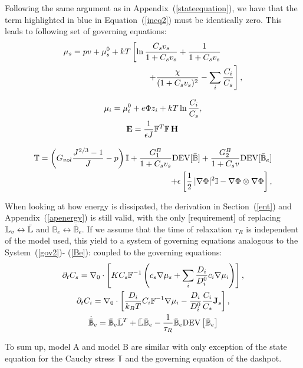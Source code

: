 Following the same argument as in Appendix~(\ref{stateequation}), we have that the term highlighted in blue in Equation~(\ref{ineq2}) must be identically zero. This leads to following set of governing equations:
\begin{gather}
\begin{aligned}
\mu_s = p v + \mu_s^0 + kT&\left[\ln \frac{C_s v_s}{1+C_s v_s} + \frac{1}{1+C_sv_s}\right.\\
&\left.\ \ \ \ \ \ +\frac{\chi}{(1+C_s v_s)^2}-\sum_i \frac{C_i}{C_s}\right], 
\end{aligned}\\[2.5mm]
\mu_i = \mu^0_i + e\Phi z_i + kT \ln \frac{C_i}{C_s},\\
\mathbf{E} = \frac{1}{\epsilon J} \mathbb{F}^T \mathbb{F}\, \mathbf{H}\, \\[3mm]
\begin{aligned}
\mathbb{T}= \left(G_{vol}\dfrac{J^{2/3}-1}{J}-p\right) \mathbb{I} + \frac{G^B_1}{1+C_sv_s}\text{DEV}[\bar{\mathbb{B}}] + \frac{G^B_2}{1+C_sv}\text{DEV}[\bar{\mathbb{B}}_e]\\
+ \epsilon \left[\frac{1}{2} \,|\nabla \Phi|^2\mathbb{I} -\nabla \Phi \otimes \nabla \Phi\right],\label{sys2B}
\end{aligned}
\end{gather}

When looking at how energy is dissipated, the derivation in Section~(\ref{ent}) and Appendix~(\ref{apenergy}) is still valid, with the only [requirement] of replacing $\mathbb{L}_v\leftrightarrow \bar{\mathbb{L}}$ and $\mathbb{B}_e\leftrightarrow\mathbb{\bar{B}}_e$. If we assume that the time of relaxation $\tau_R$ is independent of the model used, this yield to a system of governing equations analogous to the System~(\ref{gov2})- (\ref{Be}):
coupled to the governing equations:
\begin{gather}
\partial_t C_s=\nabla_0 \cdot\left[K C_s \mathbb{F}^{-1}\left(c_s\nabla \mu_s +\sum_i \frac{D_i}{D^0_i} c_i \nabla \mu_i\right)\right],\\
\partial_t C_i= \nabla_0\cdot\left[\frac{D_i}{k_B T}C_i\mathbb{F}^{-1}\nabla \mu_i -\frac{D_i}{D^0_i} \frac{C_i}{C_s} \mathbf{J}_s\right],\\
\dot{\bar{\mathbb{B}}}_e = \bar{\mathbb{B}}_e \bar{\mathbb{L}}^T +\bar{\mathbb{L}} \bar{\mathbb{B}}_e -\frac{1}{\tau_R} \bar{\mathbb{B}}_e \text{DEV}\left[\bar{\mathbb{B}}_e\right]\label{BeB}
\end{gather}

To sum up, model A and model B are similar with only exception of the state equation for the Cauchy stress $\mathbb{T}$ and the governing equation of the dashpot.
